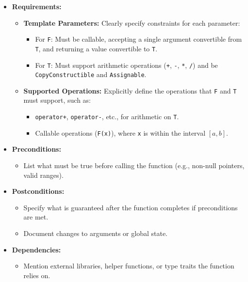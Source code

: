 \documentclass[fontsize=8pt, a4paper, landscape, fleqn]{scrartcl}
\begin{document}
\begin{multicols*}{3}[\raggedcolumns]
\begin{itemize}
    \item \textbf{Requirements:}
    \begin{itemize}
        \item \textbf{Template Parameters:} Clearly specify constraints for each parameter:
        \begin{itemize}
            \item For \texttt{F}: Must be callable, accepting a single argument convertible from \texttt{T}, and returning a value convertible to \texttt{T}.
            \item For \texttt{T}: Must support arithmetic operations (\texttt{+}, \texttt{-}, \texttt{*}, \texttt{/}) and be \texttt{CopyConstructible} and \texttt{Assignable}.
        \end{itemize}
        \item \textbf{Supported Operations:} Explicitly define the operations that \texttt{F} and \texttt{T} must support, such as:
        \begin{itemize}
            \item \texttt{operator+}, \texttt{operator-}, etc., for arithmetic on \texttt{T}.
            \item Callable operations (\texttt{F(x)}), where \texttt{x} is within the interval \([a, b]\).
        \end{itemize}
    \end{itemize}

    \item \textbf{Preconditions:}
    \begin{itemize}
        \item List what must be true before calling the function (e.g., non-null pointers, valid ranges).
    \end{itemize}

    \item \textbf{Postconditions:}
    \begin{itemize}
        \item Specify what is guaranteed after the function completes if preconditions are met.
        \item Document changes to arguments or global state.
    \end{itemize}

    \item \textbf{Dependencies:}
    \begin{itemize}
        \item Mention external libraries, helper functions, or type traits the function relies on.
    \end{itemize}


\end{itemize}
\end{multicols*}
\end{document}
